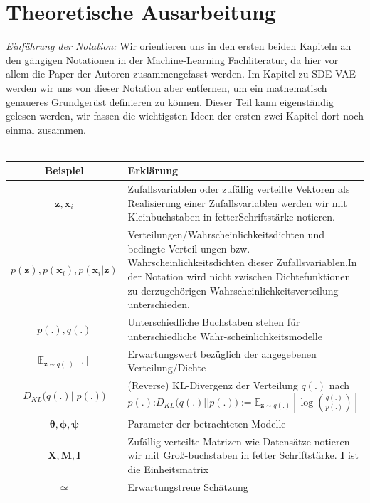 \documentclass[12pt]{article}
\newcommand{\E}{\mathbb{E}}
\newcommand{\z}{\mathbf{z}}
\newcommand{\x}{\mathbf{x}_i}
\begin{document}
	\section[Theoretische Ausarbeitung]{Theoretische Ausarbeitung}
	\emph{Einführung der Notation:} Wir orientieren uns in den ersten beiden Kapiteln an den gängigen Notationen in der Machine-Learning Fachliteratur, da hier vor allem die Paper der Autoren zusammengefasst werden. Im Kapitel zu SDE-VAE werden wir uns von dieser Notation aber entfernen, um ein mathematisch genaueres Grundgerüst definieren zu können. Dieser Teil kann eigenständig gelesen werden, wir fassen die wichtigsten Ideen der ersten zwei Kapitel dort noch einmal zusammen.\\ \
	\\
	\begin{tabular}{|c|p{11.9cm}|}
			\hline
			\textbf{Beispiel} & \textbf{Erklärung}  \\
			\hline
			$\z, \x$ &  Zufallsvariablen oder zufällig verteilte Vektoren als Realisierung \newline einer Zufallsvariablen werden wir mit Kleinbuchstaben in fetter\newline Schriftstärke notieren.  \\
			\hline
			$p(\z), p(\x), p(\x|\z)$ & Verteilungen/Wahrscheinlichkeitsdichten und bedingte Verteil-\newline ungen bzw. Wahrscheinlichkeitsdichten dieser Zufallsvariablen.\newline In der Notation wird nicht zwischen Dichtefunktionen zu der\newline zugehörigen Wahrscheinlichkeitsverteilung unterschieden.\\
			\hline
			$p(.), q(.)$ & Unterschiedliche Buchstaben stehen für unterschiedliche Wahr-\newline scheinlichkeitsmodelle\\
			\hline
			$\E_{\z\sim q(.)}[.]$ & Erwartungswert bezüglich der angegebenen Verteilung/Dichte\\
			\hline
			$D_{KL}\big(q(.)||p(.)\big)$ & (Reverse) KL-Divergenz der Verteilung $q(.)$ nach $p(.)$:\newline $D_{KL}\big(q(.)||p(.)\big):= \E_{\z\sim q(.)}\left[\log\left(\tfrac{q(.)}{p(.)}\right)\right]$ \\
			\hline
			$\boldsymbol\theta, \boldsymbol\phi, \boldsymbol\psi $ & Parameter der betrachteten Modelle \\
			\hline
			$\mathbf{X}, \mathbf{M}, \mathbf{I} $ & Zufällig verteilte Matrizen wie Datensätze notieren wir mit Groß-\newline buchstaben in fetter Schriftstärke. $\mathbf{I}$ ist die Einheitsmatrix \\
			\hline
			$\simeq $ & Erwartungstreue Schätzung \\
			\hline
		\end{tabular}
	\vspace{1cm}
\end{document}
